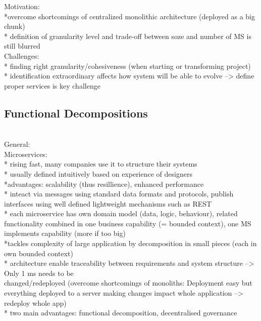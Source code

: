 Motivation:\\
*overcome shortcomings of centralized monolithic architecture (deployed as a big chunk)\\
* definition of granularity level and trade-off between soze and number of MS is still blurred\\

Challenges: \\
* finding right granularity/cohesiveness (when starting or transforming project)\\
* identification extraordinary affects how system will be able to evolve --> define proper services is key challenge\\

\subsection{Functional Decompositions}
\cite{FunctionalDecompositionHeinrich}\\

General:\\


Microservices: \\
* rising fast, many companies use it to structure their systems\\
* usually defined intuitively based on experience of designers\\
*advantages: scalability (thus resillience), enhanced performance\\
* inteact via messages using standard data formats and protocols, publish interfaces using well defined lightweight mechanisms such as REST\\
* each microservice has own domain model (data, logic, behaviour), related functionality combined in one business capability (= bounded context), one MS implements capability (more if too big)\\
*tackles complexity of large application by decomposition in small pieces (each in own bounded context)\\
* architecture enable traceability between requirements and system structure --> Only 1 ms needs to be\\ changed/redeployed (overcome shortcomings of monoliths: Deployment easy but everything deployed to a server making changes impact whole application --> redeploy whole app)\\
* two main advantages: functional decomposition, decentralised governance\\
 




